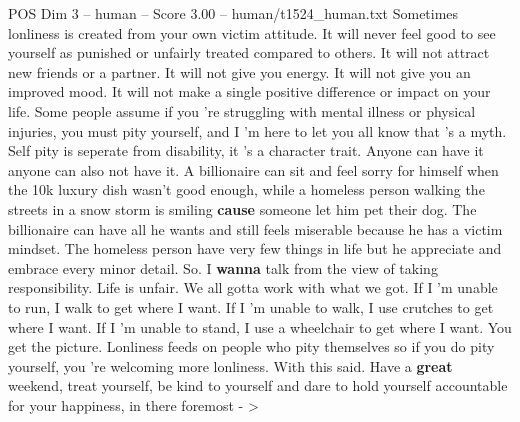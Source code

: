 \begin{textsample}{POS Dim 3 – human – Score 3.00 – human/t1524\_human.txt}  \label{ex:f3_pos_018}
Sometimes lonliness is created from your own victim attitude.
It will never feel good to see yourself as punished or unfairly treated compared to others.
It will not attract new friends or a partner.
It will not give you energy.
It will not give you an improved mood.
It will not make a single positive difference or impact on your life.
Some people assume if you 're struggling with mental illness or physical injuries, you must pity yourself, and I 'm here to let you all know that 's a myth.
Self pity is seperate from disability, it 's a character trait.
Anyone can have it anyone can also not have it.
A billionaire can sit and feel sorry for himself when the 10k luxury dish wasn't good enough, while a homeless person walking the streets in a snow storm is smiling \textbf{cause} someone let him pet their dog.
The billionaire can have all he wants and still feels miserable because he has a victim mindset.
The homeless person have very few things in life but he appreciate and embrace every minor detail.
So.
I \textbf{wanna} talk from the view of taking responsibility.
Life is unfair.
We all gotta work with what we got.
If I 'm unable to run, I walk to get where I want.
If I 'm unable to walk, I use crutches to get where I want.
If I 'm unable to stand, I use a wheelchair to get where I want.
You get the picture.
Lonliness feeds on people who pity themselves so if you do pity yourself, you 're welcoming more lonliness.
With this said.
Have a \textbf{great} weekend, treat yourself, be kind to yourself and dare to hold yourself accountable for your happiness, in there foremost - > {\EmojiFont 🧠} {\EmojiFont 💝}

\end{textsample}
